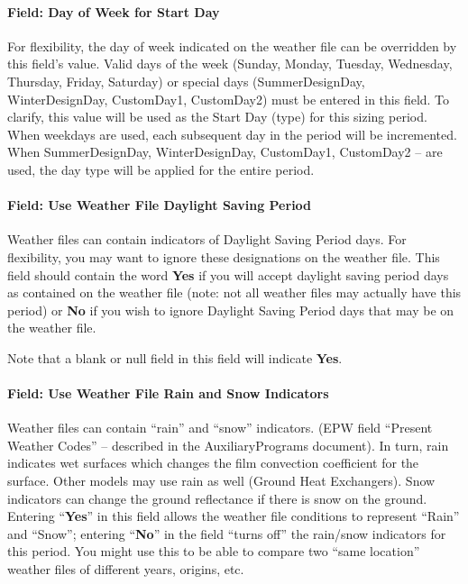 \paragraph{Field: Day of Week for Start Day}\label{field-day-of-week-for-start-day-1}

For flexibility, the day of week indicated on the weather file can be overridden by this field's value. Valid days of the week (Sunday, Monday, Tuesday, Wednesday, Thursday, Friday, Saturday) or special days (SummerDesignDay, WinterDesignDay, CustomDay1, CustomDay2) must be entered in this field. To clarify, this value will be used as the Start Day (type) for this sizing period. When weekdays are used, each subsequent day in the period will be incremented. When SummerDesignDay, WinterDesignDay, CustomDay1, CustomDay2 -- are used, the day type will be applied for the entire period.

\paragraph{Field: Use Weather File Daylight Saving Period}\label{field-use-weather-file-daylight-saving-period-1}

Weather files can contain indicators of Daylight Saving Period days. For flexibility, you may want to ignore these designations on the weather file. This field should contain the word \textbf{Yes} if you will accept daylight saving period days as contained on the weather file (note: not all weather files may actually have this period) or \textbf{No} if you wish to ignore Daylight Saving Period days that may be on the weather file.

Note that a blank or null field in this field will indicate \textbf{Yes}.

\paragraph{Field: Use Weather File Rain and Snow Indicators}\label{field-use-weather-file-rain-and-snow-indicators-1}

Weather files can contain ``rain'' and ``snow'' indicators. (EPW field ``Present Weather Codes'' -- described in the AuxiliaryPrograms document). In turn, rain indicates wet surfaces which changes the film convection coefficient for the surface. Other models may use rain as well (Ground Heat Exchangers). Snow indicators can change the ground reflectance if there is snow on the ground. Entering ``\textbf{Yes}'' in this field allows the weather file conditions to represent ``Rain'' and ``Snow''; entering ``\textbf{No}'' in the field ``turns off'' the rain/snow indicators for this period. You might use this to be able to compare two ``same location'' weather files of different years, origins, etc.

